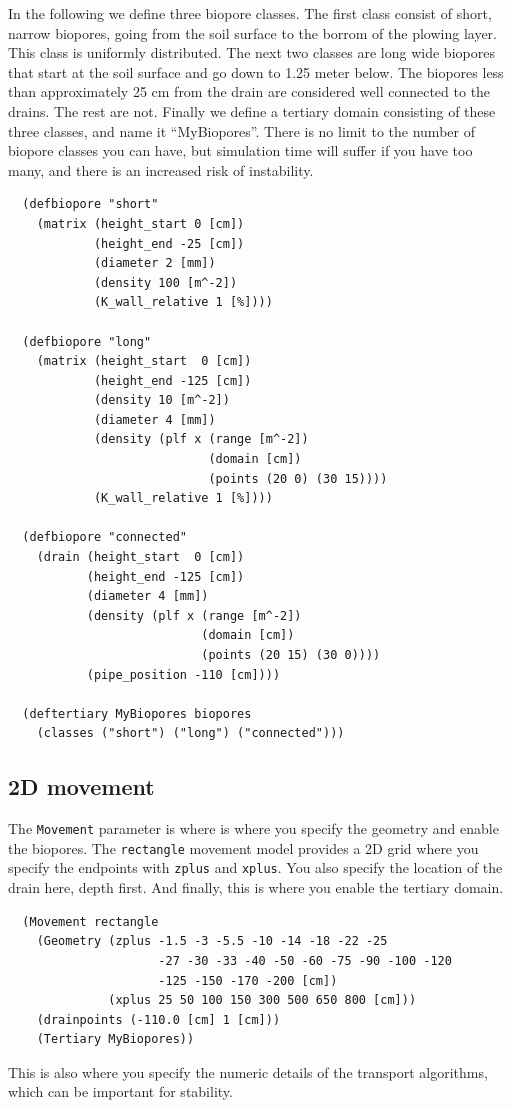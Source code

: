 \documentclass[a4paper]{article}
\begin{document}
In the following we define three biopore classes.  The first class
consist of short, narrow biopores, going from the soil surface to the
borrom of the plowing layer.  This class is uniformly distributed.
The next two classes are long wide biopores that start at the soil
surface and go down to 1.25 meter below.  The biopores less than
approximately 25 cm from the drain are considered well connected to
the drains.  The rest are not.  Finally we define a tertiary domain
consisting of these three classes, and name it ``MyBiopores''.  There
is no limit to the number of biopore classes you can have, but
simulation time will suffer if you have too many, and there is an
increased risk of instability.
\begin{verbatim}
  (defbiopore "short"
    (matrix (height_start 0 [cm])
            (height_end -25 [cm])
            (diameter 2 [mm])
            (density 100 [m^-2])
            (K_wall_relative 1 [%])))

  (defbiopore "long"
    (matrix (height_start  0 [cm])
            (height_end -125 [cm])
            (density 10 [m^-2])
            (diameter 4 [mm])
            (density (plf x (range [m^-2])
                            (domain [cm])
                            (points (20 0) (30 15))))
            (K_wall_relative 1 [%])))

  (defbiopore "connected"
    (drain (height_start  0 [cm])
           (height_end -125 [cm])
           (diameter 4 [mm])
           (density (plf x (range [m^-2])
                           (domain [cm])
                           (points (20 15) (30 0))))
           (pipe_position -110 [cm])))

  (deftertiary MyBiopores biopores
    (classes ("short") ("long") ("connected")))
\end{verbatim}

\subsection{2D movement}

The \texttt{Movement} parameter is where is where you specify the
geometry and enable the biopores.  The \texttt{rectangle} movement
model provides a 2D grid where you specify the endpoints with
\texttt{zplus} and \texttt{xplus}.  You also specify the location of
the drain here, depth first.  And finally, this is where you enable
the tertiary domain.
\begin{verbatim}
  (Movement rectangle
    (Geometry (zplus -1.5 -3 -5.5 -10 -14 -18 -22 -25 
                     -27 -30 -33 -40 -50 -60 -75 -90 -100 -120
                     -125 -150 -170 -200 [cm])
              (xplus 25 50 100 150 300 500 650 800 [cm]))
    (drainpoints (-110.0 [cm] 1 [cm]))
    (Tertiary MyBiopores))
\end{verbatim}
This is also where you specify the numeric details of the transport
algorithms, which can be important for stability.
\end{document}
